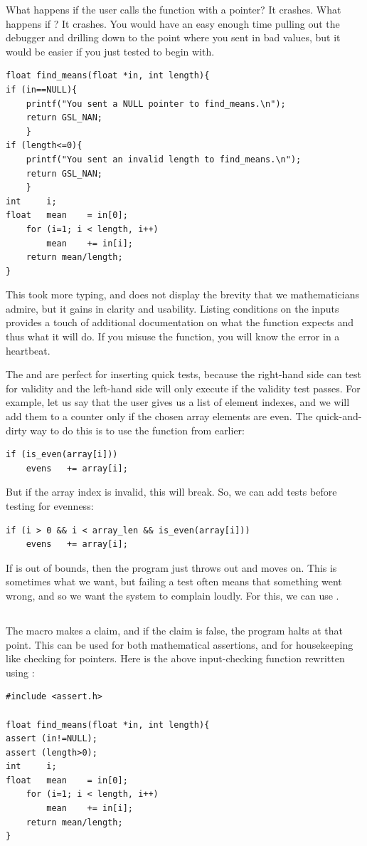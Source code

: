 What happens if the user calls the function with a 
pointer? It crashes. What happens if ? It crashes.
You would have an easy enough time pulling out the debugger and drilling
down to the point where you sent in bad values, but it would be easier
if you just tested to begin with.
\begin{lstlisting}
float find_means(float *in, int length){
if (in==NULL){
    printf("You sent a NULL pointer to find_means.\n");
    return GSL_NAN;
    }
if (length<=0){
    printf("You sent an invalid length to find_means.\n");
    return GSL_NAN;
    }
int     i;
float   mean    = in[0];
    for (i=1; i < length, i++)
        mean    += in[i];
    return mean/length;
}
\end{lstlisting}
This took more typing, and does not display the brevity that we
mathematicians admire, but it gains in clarity and usability. Listing
conditions on the inputs provides a touch of additional documentation on
what the function expects and thus what it will do. If you misuse the
function, you will know the error in a heartbeat.

The \ci{\&\&} and \ci{||} are perfect for inserting quick tests,
because the right-hand side can test for validity and the left-hand
side will only execute if the validity test passes. For example, 
let us say that the user gives us a list of element indexes, and we will
add them to a counter only if the chosen array elements are even. The
quick-and-dirty way to do this is to use the  function
from earlier:
\begin{lstlisting}
if (is_even(array[i]))
    evens   += array[i];
\end{lstlisting}
But if the array index is invalid, this will break. So, we can add tests
before testing for evenness:
\begin{lstlisting}
if (i > 0 && i < array_len && is_even(array[i]))
    evens   += array[i];
\end{lstlisting}
If  is out of bounds, then the program just throws  out and 
moves on. This is sometimes what we want, but failing a test often means
that something went wrong, and so we want the system to complain loudly.
For this, we can use .

\subsection{}  
The  macro makes a claim, and if the claim is false, the
program halts at that point. This can be used for both mathematical
assertions, and for housekeeping like checking for 
pointers. Here is the above input-checking function rewritten using
:
\begin{lstlisting}
#include <assert.h>

float find_means(float *in, int length){
assert (in!=NULL);
assert (length>0);
int     i;
float   mean    = in[0];
    for (i=1; i < length, i++)
        mean    += in[i];
    return mean/length;
}
\end{lstlisting}

